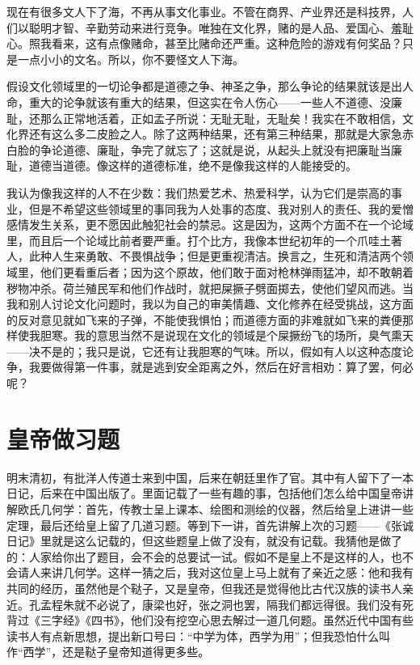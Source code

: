 现在有很多文人下了海，不再从事文化事业。不管在商界、产业界还是科技界，人们以聪明才智、辛勤劳动来进行竞争。唯独在文化界，赌的是人品、爱国心、羞耻心。照我看来，这有点像赌命，甚至比赌命还严重。这种危险的游戏有何奖品？只是一点小小的文名。所以，你不要怪文人下海。 

假设文化领域里的一切论争都是道德之争、神圣之争，那么争论的结果就该是出人命，重大的论争就该有重大的结果，但这实在令人伤心——一些人不道德、没廉耻，还那么正常地活着，正如孟子所说：无耻无耻，无耻矣！我实在不敢相信，文化界还有这么多二皮脸之人。除了这两种结果，还有第三种结果，那就是大家急赤白脸的争论道德、廉耻，争完了就忘了；这就是说，从起头上就没有把廉耻当廉耻，道德当道德。像这样的道德标准，绝不是像我这样的人能接受的。 

我认为像我这样的人不在少数：我们热爱艺术、热爱科学，认为它们是崇高的事业，但是不希望这些领域里的事同我为人处事的态度、我对别人的责任、我的爱憎感情发生关系，更不愿因此触犯社会的禁忌。这是因为，这两个方面不在一个论域里，而且后一个论域比前者要严重。打个比方，我像本世纪初年的一个爪哇土著人，此种人生来勇敢、不畏惧战争；但是更重视清洁。换言之，生死和清洁两个领域里，他们更看重后者；因为这个原故，他们敢于面对枪林弹雨猛冲，却不敢朝着秽物冲杀。荷兰殖民军和他们作战时，就把屎撅子劈面掷去，使他们望风而逃。当我和别人讨论文化问题时，我以为自己的审美情趣、文化修养在经受挑战，这方面的反对意见就如飞来的子弹，不能使我惧怕；而道德方面的非难就如飞来的粪便那样使我胆寒。我的意思当然不是说现在文化的领域是个屎撅纷飞的场所，臭气熏天——决不是的；我只是说，它还有让我胆寒的气味。所以，假如有人以这种态度论争，我要做得第一件事，就是逃到安全距离之外，然后在好言相劝：算了罢，何必呢？
 
\chapter{皇帝做习题}

明末清初，有批洋人传道士来到中国，后来在朝廷里作了官。其中有人留下了一本日记，后来在中国出版了。里面记载了一些有趣的事，包括他们怎么给中国皇帝讲解欧氏几何学：首先，传教士呈上课本、绘图和测绘的仪器，然后给皇上进讲一些定理，最后还给皇上留了几道习题。等到下一讲，首先讲解上次的习题——《张诚日记》里就是这么记载的，但这些题皇上做了没有，就没有记载。我猜他是做了的：人家给你出了题目，会不会的总要试一试。假如不是皇上不是这样的人，也不会请人来讲几何学。这样一猜之后，我对这位皇上马上就有了亲近之感：他和我有共同的经历，虽然他是个鞑子，又是皇帝，但我还是觉得他比古代汉族的读书人亲近。孔孟程朱就不必说了，康梁也好，张之洞也罢，隔我们都远得很。我们没有死背过《三字经》《四书》，他们没有挖空心思去解过一道几何题。虽然近代中国有些读书人有点新思想，提出新口号曰：“中学为体，西学为用”；但我恐怕什么叫作“西学”，还是鞑子皇帝知道得更多些。 

